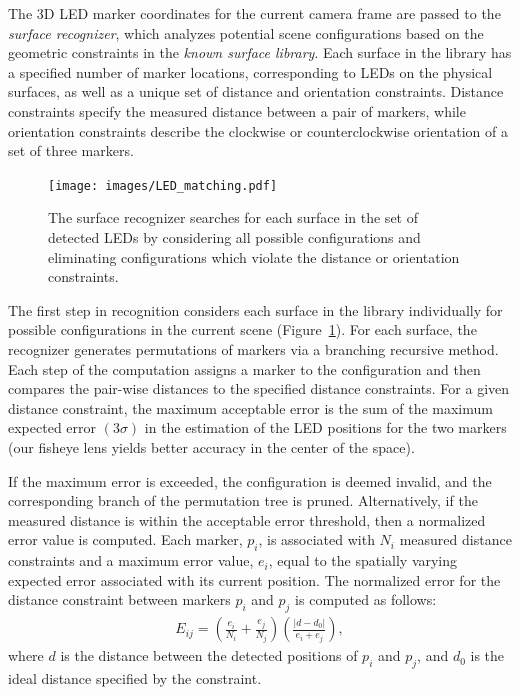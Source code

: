 \documentclass{thesis}
\begin{document}
The 3D LED marker coordinates for the current camera frame are passed to the {\em surface recognizer}, which analyzes potential scene configurations based on the geometric constraints in the {\em known surface library}. Each surface in the library has a specified number of marker locations, corresponding to LEDs on the physical surfaces, as well as a unique set of distance and orientation constraints. Distance constraints specify the measured distance between a pair of markers, while orientation constraints describe the clockwise or
counterclockwise orientation of a set of three markers.

\begin{figure}[t]
\texttt{[image: images/LED\_matching.pdf]}
\caption[Large-Scale Surface Recognition Algorithm]{ The surface  recognizer searches for each surface in the set of detected LEDs by considering all possible configurations and eliminating configurations which violate the distance or orientation constraints. }
\label{FIGURE:matching_diagram}
\end{figure}

The first step in recognition considers each surface in the
library individually for possible configurations in the current scene
(Figure~\ref{FIGURE:matching_diagram}). For each surface, the
recognizer generates permutations of markers via a branching recursive
method. Each step of the computation assigns a marker to the
configuration and then compares the pair-wise distances to the
specified distance constraints.  For a given distance constraint, the
maximum acceptable error is the sum of the maximum expected
error $(3\sigma)$ in the estimation of the LED positions for the two markers (our fisheye lens yields better accuracy in the center of the space).

If the maximum error is exceeded, the configuration is deemed invalid,
and the corresponding branch of the permutation tree is pruned. Alternatively, if the measured distance is within the acceptable error threshold, then a normalized error value is computed. Each marker, $p_i$, is associated with $N_i$ measured distance constraints and a maximum error value, $e_i$, equal to the spatially varying expected error associated with its current position. The normalized error for the distance constraint between markers $p_i$ and $p_j$ is computed as follows:
\begin{eqnarray}
E_{ij} = \left(\frac{e_i}{N_i} + \frac{e_j}{N_j}\right) \left( \frac{| d - d_0 |}{e_i + e_j}\right), \label{eqn:normerr}
\end{eqnarray}
where $d$ is the distance between the detected positions of $p_i$ and $p_j$, and $d_0$ is the ideal distance specified by the constraint.
\end{document}
